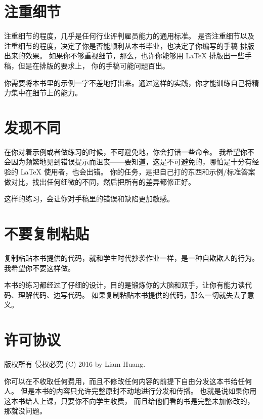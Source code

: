 \section*{注重细节}
\label{sec:the_details}

注重细节的程度，几乎是任何行业评判雇员能力的通用标准。
是否注重细节以及注重细节的程度，决定了你是否能顺利从本书毕业，也决定了你编写的手稿
排版出来的效果。
如果你不够重视细节，那么，也许你能够用 \LaTeX{} 排版出一些手稿，但是在排版的要求上，
你的手稿可能问题百出。

你需要将本书里的示例一字不差地打出来。通过这样的实践，你才能训练自己将精力集中在细节上的能力。

\section*{发现不同}
\label{sec:the_difference}

在你对着示例或者做练习的时候，不可避免地，你会打错一些命令。
我希望你不会因为频繁地见到错误提示而沮丧——要知道，这是不可避免的，哪怕是十分有经验的 \LaTeX{}
使用者，也会出错。
你的任务，是把自己打的东西和示例/标准答案做对比，找出任何细微的不同，然后把所有的差异都修正好。

这样的练习，会让你对手稿里的错误和缺陷更加敏感。

\section*{不要复制粘贴}
\label{sec:no_copy_and_paste}

复制粘贴本书提供的代码，就和学生时代抄袭作业一样，是一种自欺欺人的行为。我希望你不要这样做。

本书的练习都经过了仔细的设计，目的是锻炼你的大脑和双手，让你有能力读代码、理解代码、边写代码。
如果复制粘贴本书提供的代码，那么一切就失去了意义。

\section*{许可协议}
\label{sec:license}

版权所有 侵权必究 (C) 2016 by Liam Huang.

你可以在不收取任何费用，而且不修改任何内容的前提下自由分发这本书给任何人。
但是本书的内容只允许完整原封不动地进行分发和传播。
也就是说如果你用这本书给人上课，只要你不向学生收费，
而且给他们看的书是完整未加修改的，那就没问题。
\endinput
